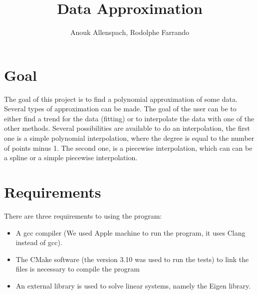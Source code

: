 \documentclass[12pt]{article}
\begin{document}
 
\title{Data Approximation}
\author{Anouk Allenspach, Rodolphe Farrando}  
\maketitle
 

\section{Goal}
The goal of this project is to find a polynomial approximation of some data. Several types of approximation can be made. The goal of the user can be to either  find a trend for the data (fitting) or to interpolate the data with one of the other methods. Several possibilities are available to do an interpolation, the first one is a simple polynomial interpolation, where the degree is equal to the number of points minus 1. The second one, is a piecewise interpolation, which can can be a spline or a simple piecewise interpolation.

\section{Requirements}
There are three requirements to using the program:
\begin{itemize}
\item A gcc compiler (We used Apple machine to run the program, it uses Clang instead of gcc).
\item The CMake software (the version 3.10 was used to run the tests) to link the files is necessary to compile the program
\item An external library is used to solve linear systems, namely the Eigen library.
\end{itemize}
\end{document}
